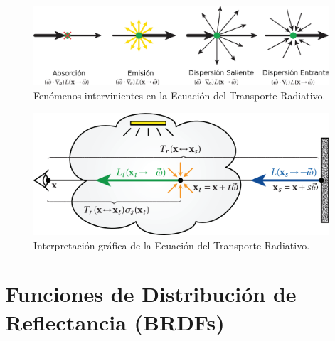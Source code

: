 \begin{figure}
\center
\includegraphics[width=11cm]{figures/fenomenosrte}
\caption{Fenómenos intervinientes en la Ecuación del Transporte Radiativo.}
\label{fg:fenomenosrte}
\end{figure}

\begin{figure}
\center
\includegraphics[width=11cm]{figures/rte}
\caption{Interpretación gráfica de la Ecuación del Transporte Radiativo.}
\label{fg:rte}
\end{figure}


\section{Funciones de Distribución de Reflectancia (BRDFs)}
